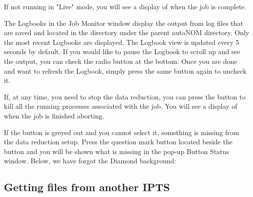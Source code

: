   \noindent{}
  
If not running in "Live" mode, you will see a display of  when the job is complete.

The Logbooks in the Job Monitor window display the output from log files that are saved and located in the  directory under the parent autoNOM directory. Only the most recent Logbooks are displayed. The Logbook view is updated every 5 seconds by default. If you would like to pause the Logbook to scroll up and see the output, you can check the  radio button at the bottom. Once you are done and want to refresh the Logbook, simply press the same button again to uncheck it.

If, at any time, you need to stop the data reduction, you can press the  button to kill all the running processes associated with the job. You will see a display of  when the job is finished aborting.

If the  button is greyed out and you cannot select it, something is missing from the data reduction setup. Press the question mark button located beside the  button and you will be shown what is missing in the pop-up Button Status window. Below, we have forgot the Diamond background:

  \noindent{}

\subsection{Getting files from another IPTS}

